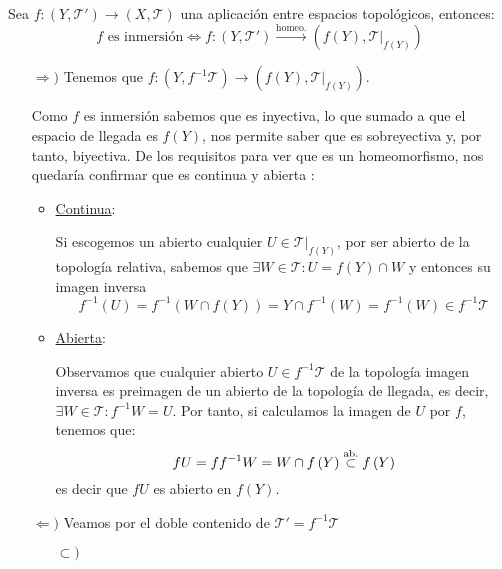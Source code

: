 \begin{prop}
Sea $f: \left( Y, \mathcal{T}' \right) \rightarrow \left( X, \mathcal{T} \right)$ una aplicación entre espacios topológicos, entonces:
\[
    f\text{ es inmersión} \Leftrightarrow f: \left( Y, \mathcal{T}' \right) \xrightarrow{\text{homeo.}} \left( f\left( Y \right), \mathcal{T}|_{f\left( Y \right)} \right)
\]
\end{prop}
\begin{demo}
\begin{itemize}
    \item[$\Rightarrow)$] Tenemos que $f: \left( Y, f^{-1}\mathcal{T} \right) \rightarrow \left( f\left( Y \right), \mathcal{T}|_{f\left( Y \right)} \right)$. 

    Como $f$ es inmersión sabemos que es inyectiva, lo que sumado a que el espacio de llegada es $f(Y)$, nos permite saber que es sobreyectiva y, por tanto, biyectiva. De los requisitos para ver que es un homeomorfismo, nos quedaría confirmar que es continua y abierta :
    \begin{itemize}
        \item \underline{Continua}:
        
        Si escogemos un abierto cualquier $U\in \mathcal{T}|_{f(Y)}$, por ser abierto de la topología relativa, sabemos que $\exists W \in \mathcal{T}: U = f\left( Y \right) \cap W $ y entonces su imagen inversa
        \[
        f^{-1}\left( U \right) = f^{-1}\left( W \cap f\left( Y \right) \right) = Y \cap f^{-1}\left( W \right) = f^{-1}\left( W \right) \in f^{-1}\mathcal{T}
        \]

        \item \underline{Abierta}:
        
        Observamos que cualquier abierto $U \in f^{-1}\mathcal{T}$ de la topología imagen inversa es preimagen de un abierto de la topología de llegada, es decir, $\exists W \in \mathcal{T}: f^{-1}W = U$. Por tanto, si calculamos la imagen de $U$ por $f$, tenemos que:
        \[
        fU = ff^{-1}W = W \cap f\left( Y \right) \stackrel{\text{ab.}}{\subset} f\left( Y \right)
        \]
        es decir que $fU$ es abierto en $f\left( Y \right)$.
    \end{itemize}

    \item[$\Leftarrow)$] Veamos por el doble contenido de $\mathcal{T}' = f^{-1}\mathcal{T}$
    \begin{itemize}
        \item[$\subset)$]
        

\end{itemize}
\end{itemize}
\end{demo}
